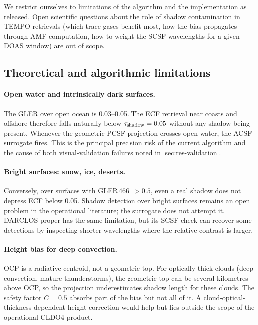 \documentclass[11pt,a4paper]{article}
\begin{document}
We restrict ourselves to limitations of the algorithm and the
implementation as released. Open scientific questions about the role
of shadow contamination in TEMPO retrievals (which trace gases benefit
most, how the bias propagates through AMF computation, how to weight
the SCSF wavelengths for a given DOAS window) are out of scope.

\subsection{Theoretical and algorithmic limitations}\label{sec:lim-theory}

\paragraph{Open water and intrinsically dark surfaces.}
The GLER over open ocean is 0.03--0.05. The ECF retrieval near coasts
and offshore therefore falls naturally below
$\tau_{\rm shadow} = 0.05$ without any shadow being present. Whenever
the geometric PCSF projection crosses open water, the ACSF surrogate
fires. This is the principal precision risk of the current algorithm
and the cause of both visual-validation failures noted in
\cref{sec:res-validation}.

\paragraph{Bright surfaces: snow, ice, deserts.}
Conversely, over surfaces with GLER\,466~$> 0.5$, even a real shadow
does not depress ECF below 0.05. Shadow detection over bright surfaces
remains an open problem in the operational literature; the surrogate
does not attempt it. DARCLOS proper has the same limitation, but its
SCSF check can recover some detections by inspecting shorter
wavelengths where the relative contrast is larger.

\paragraph{Height bias for deep convection.}
OCP is a radiative centroid, not a geometric top. For optically thick
clouds (deep convection, mature thunderstorms), the geometric top can
be several kilometres above OCP, so the projection underestimates
shadow length for these clouds. The safety factor $C = 0.5$ absorbs
part of the bias but not all of it. A cloud-optical-thickness-dependent
height correction would help but lies outside the scope of the
operational CLDO4 product.
\end{document}
